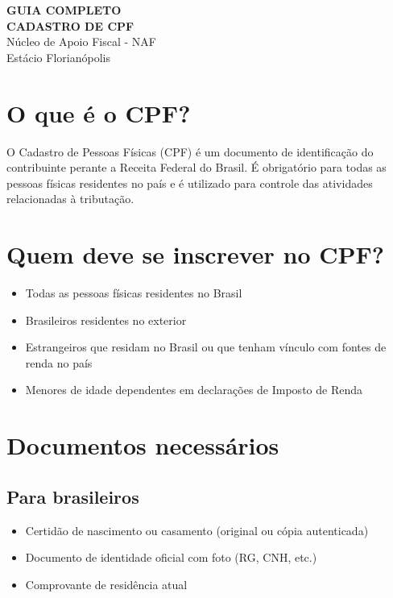 \documentclass[12pt,a4paper]{article}
\begin{document}
\begin{center}
{\LARGE \textbf{GUIA COMPLETO}}\\[0.5cm]
{\Large \textbf{CADASTRO DE CPF}}\\[0.5cm]
{\large Núcleo de Apoio Fiscal - NAF}\\
{\large Estácio Florianópolis}\\[1cm]
\end{center}

\section{O que é o CPF?}

O Cadastro de Pessoas Físicas (CPF) é um documento de identificação do contribuinte perante a Receita Federal do Brasil. É obrigatório para todas as pessoas físicas residentes no país e é utilizado para controle das atividades relacionadas à tributação.

\section{Quem deve se inscrever no CPF?}

\begin{itemize}
    \item Todas as pessoas físicas residentes no Brasil
    \item Brasileiros residentes no exterior
    \item Estrangeiros que residam no Brasil ou que tenham vínculo com fontes de renda no país
    \item Menores de idade dependentes em declarações de Imposto de Renda
\end{itemize}

\section{Documentos necessários}

\subsection{Para brasileiros}
\begin{itemize}
    \item Certidão de nascimento ou casamento (original ou cópia autenticada)
    \item Documento de identidade oficial com foto (RG, CNH, etc.)
    \item Comprovante de residência atual
\end{itemize}
\end{document}
